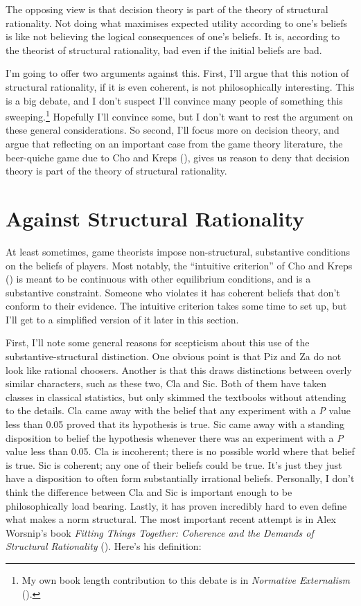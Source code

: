 \documentclass[
  12pt,
  letterpaper,
  DIV=11,
  numbers=noendperiod]{scrreprt}
\begin{document}
The opposing view is that decision theory is part of the theory of
structural rationality. Not doing what maximises expected utility
according to one's beliefs is like not believing the logical
consequences of one's beliefs. It is, according to the theorist of
structural rationality, bad even if the initial beliefs are bad.

I'm going to offer two arguments against this. First, I'll argue that
this notion of structural rationality, if it is even coherent, is not
philosophically interesting. This is a big debate, and I don't suspect
I'll convince many people of something this sweeping.\footnote{My own
  book length contribution to this debate is in \emph{Normative
  Externalism} ().}
Hopefully I'll convince some, but I don't want to rest the argument on
these general considerations. So second, I'll focus more on decision
theory, and argue that reflecting on an important case from the game
theory literature, the beer-quiche game due to Cho and Kreps
(), gives us reason to deny that
decision theory is part of the theory of structural rationality.

\section{Against Structural Rationality}\label{sec-against-structural}

At least sometimes, game theorists impose non-structural, substantive
conditions on the beliefs of players. Most notably, the ``intuitive
criterion'' of Cho and Kreps () is
meant to be continuous with other equilibrium conditions, and is a
substantive constraint. Someone who violates it has coherent beliefs
that don't conform to their evidence. The intuitive criterion takes some
time to set up, but I'll get to a simplified version of it later in this
section.

First, I'll note some general reasons for scepticism about this use of
the substantive-structural distinction. One obvious point is that Piz
and Za do not look like rational choosers. Another is that this draws
distinctions between overly similar characters, such as these two, Cla
and Sic. Both of them have taken classes in classical statistics, but
only skimmed the textbooks without attending to the details. Cla came
away with the belief that any experiment with a \emph{P} value less than
0.05 proved that its hypothesis is true. Sic came away with a standing
disposition to belief the hypothesis whenever there was an experiment
with a \emph{P} value less than 0.05. Cla is incoherent; there is no
possible world where that belief is true. Sic is coherent; any one of
their beliefs could be true. It's just they just have a disposition to
often form substantially irrational beliefs. Personally, I don't think
the difference between Cla and Sic is important enough to be
philosophically load bearing. Lastly, it has proven incredibly hard to
even define what makes a norm structural. The most important recent
attempt is in Alex Worsnip's book \emph{Fitting Things Together:
Coherence and the Demands of Structural Rationality}
(). Here's his definition:
\end{document}
